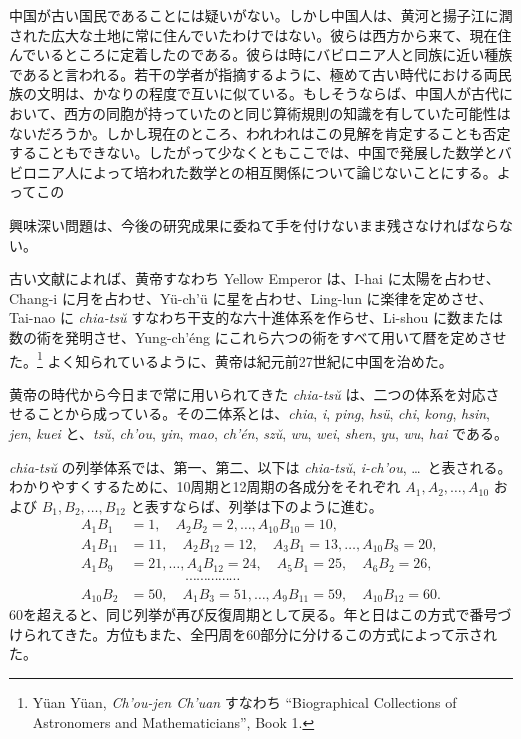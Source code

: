\documentclass[11pt]{article}
\newcommand{\scanpage}[2]{\clearpage\setcounter{footnote}{0}\noindent{\footnotesize\color{gray}PDF #1 頁 · #2}\par\medskip}
\newcommand{\scanfooter}{}
\begin{document}
中国が古い国民であることには疑いがない。しかし中国人は、黄河と揚子江に潤された広大な土地に常に住んでいたわけではない。彼らは西方から来て、現在住んでいるところに定着したのである。彼らは時にバビロニア人と同族に近い種族であると言われる。若干の学者が指摘するように、極めて古い時代における両民族の文明は、かなりの程度で互いに似ている。もしそうならば、中国人が古代において、西方の同胞が持っていたのと同じ算術規則の知識を有していた可能性はないだろうか。しかし現在のところ、われわれはこの見解を肯定することも否定することもできない。したがって少なくともここでは、中国で発展した数学とバビロニア人によって培われた数学との相互関係について論じないことにする。よってこの

\scanfooter

\scanpage{0016}{第一部・第1章、第2頁}
\setcounter{footnote}{0}
興味深い問題は、今後の研究成果に委ねて手を付けないまま残さなければならない。

古い文献によれば、黄帝すなわち Yellow Emperor は、I-hai に太陽を占わせ、Chang-i に月を占わせ、Yü-ch’ü に星を占わせ、Ling-lun に楽律を定めさせ、Tai-nao に \emph{chia-tsŭ} すなわち干支的な六十進体系を作らせ、Li-shou に数または数の術を発明させ、Yung-ch’éng にこれら六つの術をすべて用いて暦を定めさせた。\footnote{Yüan Yüan, \emph{Ch’ou-jen Ch’uan} すなわち “Biographical Collections of Astronomers and Mathematicians”, Book 1.} よく知られているように、黄帝は紀元前27世紀に中国を治めた。

黄帝の時代から今日まで常に用いられてきた \emph{chia-tsŭ} は、二つの体系を対応させることから成っている。その二体系とは、\emph{chia}, \emph{i}, \emph{ping}, \emph{hsü}, \emph{chi}, \emph{kong}, \emph{hsin}, \emph{jen}, \emph{kuei} と、\emph{tsŭ}, \emph{ch’ou}, \emph{yin}, \emph{mao}, \emph{ch’én}, \emph{szŭ}, \emph{wu}, \emph{wei}, \emph{shen}, \emph{yu}, \emph{wu}, \emph{hai} である。

\emph{chia-tsŭ} の列挙体系では、第一、第二、以下は \emph{chia-tsŭ}, \emph{i-ch’ou}, \ldots\ と表される。わかりやすくするために、10周期と12周期の各成分をそれぞれ $A_1,A_2,\ldots,A_{10}$ および $B_1,B_2,\ldots,B_{12}$ と表すならば、列挙は下のように進む。
\[
\begin{aligned}
A_1B_1&=1,\quad A_2B_2=2,\ldots, A_{10}B_{10}=10,\\
A_1B_{11}&=11,\quad A_2B_{12}=12,\quad A_3B_1=13,\ldots, A_{10}B_8=20,\\
A_1B_9&=21,\ldots, A_4B_{12}=24,\quad A_5B_1=25,\quad A_6B_2=26,\\[-.5em]
&\hspace{4em}\cdots\cdots\cdots\cdots\cdots\\[-.5em]
A_{10}B_2&=50,\quad A_1B_3=51,\ldots, A_9B_{11}=59,\quad A_{10}B_{12}=60.
\end{aligned}
\]
60を超えると、同じ列挙が再び反復周期として戻る。年と日はこの方式で番号づけられてきた。方位もまた、全円周を60部分に分けるこの方式によって示された。
\end{document}
